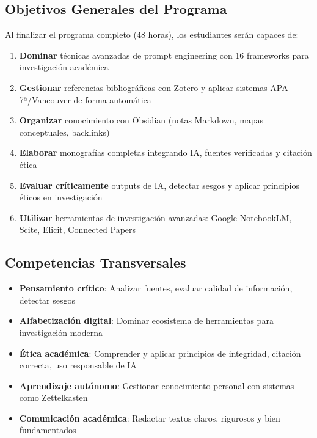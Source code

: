\documentclass[12pt,a4paper]{yaac-luatex}
\begin{document}
	\subsection*{Objetivos Generales del Programa}
	
	Al finalizar el programa completo (48 horas), los estudiantes serán capaces de:
	
	\begin{enumerate}[leftmargin=*, itemsep=0.2cm]
		\item \textbf{Dominar} técnicas avanzadas de prompt engineering con 16 frameworks para investigación académica
		\item \textbf{Gestionar} referencias bibliográficas con Zotero y aplicar sistemas APA 7ª/Vancouver de forma automática
		\item \textbf{Organizar} conocimiento con Obsidian (notas Markdown, mapas conceptuales, backlinks)
		\item \textbf{Elaborar} monografías completas integrando IA, fuentes verificadas y citación ética
		\item \textbf{Evaluar críticamente} outputs de IA, detectar sesgos y aplicar principios éticos en investigación
		\item \textbf{Utilizar} herramientas de investigación avanzadas: Google NotebookLM, Scite, Elicit, Connected Papers
	\end{enumerate}
	
	\subsection*{Competencias Transversales}
	
	\begin{tcolorbox}[
		enhanced,
		colback=lightgray,
		colframe=maincolor,
		arc=3pt,
		boxrule=1pt,
		breakable
		]
		\begin{itemize}[leftmargin=*, itemsep=0.2cm]
			\item \textbf{Pensamiento crítico}: Analizar fuentes, evaluar calidad de información, detectar sesgos
			\item \textbf{Alfabetización digital}: Dominar ecosistema de herramientas para investigación moderna
			\item \textbf{Ética académica}: Comprender y aplicar principios de integridad, citación correcta, uso responsable de IA
			\item \textbf{Aprendizaje autónomo}: Gestionar conocimiento personal con sistemas como Zettelkasten
			\item \textbf{Comunicación académica}: Redactar textos claros, rigurosos y bien fundamentados
		\end{itemize}
	\end{tcolorbox}
	
\end{document}
